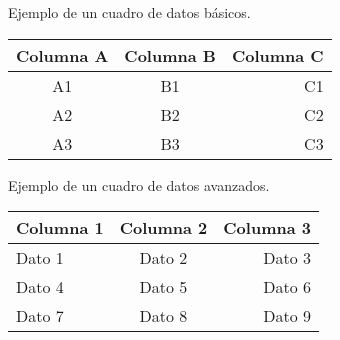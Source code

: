 

\begin{appendixtable}[ht]
    \centering
    \caption{Ejemplo de un cuadro de datos básicos.} %
    \begin{tabular}{ccr} %
        \toprule
        Columna A & Columna B & Columna C \\
        \midrule
        A1 & B1 & C1 \\
        A2 & B2 & C2 \\
        A3 & B3 & C3 \\
        \bottomrule
    \end{tabular}
    \label{tab:cuadro-datos-basico} %
\end{appendixtable}

\begin{appendixtable}[ht]
    \centering
    \caption{Ejemplo de un cuadro de datos avanzados.} %
    \begin{tabular}{l|c|r} %
        \toprule
        Columna 1 & Columna 2 & Columna 3 \\
        \midrule
        Dato 1 & Dato 2 & Dato 3 \\
        Dato 4 & Dato 5 & Dato 6 \\
        Dato 7 & Dato 8 & Dato 9 \\
        \bottomrule
    \end{tabular}
    \label{tab:cuadro-datos-avanzado} %
\end{appendixtable}
